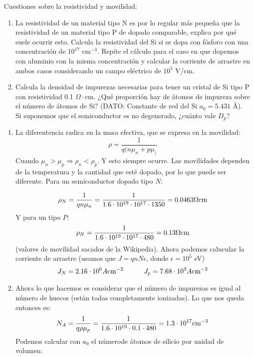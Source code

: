 \begin{texercise}
	Cuestiones sobre la resistividad y movilidad:
	\begin{enumerate}[label=\alph*)]
	\item La resistividad de un material tipo N es por lo regular más pequeña que la resistividad de un material tipo P de dopado comparable, explica por qué suele ocurrir esto. Calcula la resistividad del Si si se dopa con fósforo con una concentración de \( 10^{17} \) cm\(^{-3}\). Repite el cálculo para el caso en que dopemos con aluminio con la misma concentración y calcular la corriente de arrastre en ambos casos considerando un campo eléctrico de \( 10^5 \) V/cm.

	\item Calcula la densidad de impurezas necesarias para tener un cristal de Si tipo P con resistividad 0.1 \(\Omega\cdot\)cm. ¿Qué proporción hay de átomos de impureza sobre el número de átomos de Si? 
	(DATO: Constante de red del Si \( a_0 = 5.431 \) Å). Si suponemos que el semiconductor es no degenerado, ¿cuánto vale \( D_p \)?
	\end{enumerate}
	\tcblower
	\begin{enumerate}[label=\alph*)]
		\item La diferentencia radica en la masa efectiva, que se expresa en la movilidad:
		\begin{equation}
			\rho = \frac{1}{q(n\mu_n + p \mu_)} 
		\end{equation}
		Cuando $\mu_n>\mu_p \Rightarrow \rho_n < \rho_p$. Y esto siempre ocurre. Las movilidades dependen de la temperatura y la cantidad que esté dopado, por lo que puede ser diferente. Para un semiconductor dopado tipo $N$:

		\begin{equation}
			\rho_N = \frac{1}{qn{\mu_n}} = \frac{1}{1.6\cdot 10^{19} \cdot 10^{17}\cdot 1350}= 0.0463 \Omega \text{cm}
		\end{equation}
		Y para un tipo $P$: 
		\begin{equation}
			\rho_N = \frac{1}{1.6\cdot 10^{19} \cdot 10^{17}\cdot 480} = 0.13 \Omega \text{cm}
		\end{equation}
		(valores de movilidad sacados de la Wikipedia). Ahora podemos calucular la corriente de arrastre (usamos que $J=qnN\epsilon$, donde $\epsilon = 10^5$ eV)
		\begin{equation}
			J_N =  2.16 \cdot 10^6  A\text{cm}^{-2}  \quad \quad \quad J_p = 7.68 \cdot 10^3  A\text{cm}^{-2}  
		\end{equation}
		\item Ahora lo que hacemos es considerar que el número de impurezas es igual al número de huecos (están todas completamente ionizadas). Lo que nos queda entonces es: 
		\begin{equation}
			N_A = \frac{1}{q\rho \mu_p } = \frac{1}{1.6\cdot 10^{19} \cdot 0.1 \cdot 480} = 1.3 \cdot 10^{17} \text{cm}^{-3}
		\end{equation}
		Podemos calcular con $a_0$ el númerode átomos de silicio por unidad de volumen: 


\end{enumerate}
\end{texercise}
